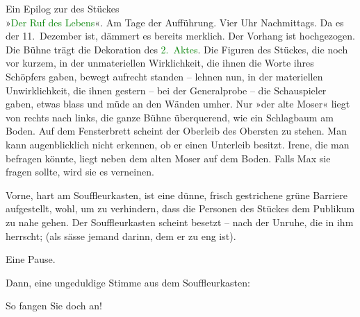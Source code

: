 \pstart
           \noindent{}\centering{}Ein Epilog zur \label{K_L01900-1v}\label{K_L01900-1h} des
                  Stückes{\\}»\textcolor{green}{Der Ruf des Lebens}{}\ledrightnote{\textcolor{green}{Der Ruf des Lebens. Schauspiel in drei Akten}}«.\pend
           {\bigskip}
\pstart
           \noindent{}Am Tage der Aufführung. Vier Uhr Nachmittags. Da es der 11. Dezember
               ist, dämmert es bereits merklich. Der Vorhang ist hochgezogen. Die Bühne trägt die
               Dekoration des \textcolor{green}{2. Aktes}{}\ledrightnote{{$\rightarrow$}\textcolor{green}{Der Ruf des Lebens. Schauspiel in drei Akten}}. Die
               Figuren des Stückes, die noch vor kurzem, in der unmateriellen Wirklichkeit, die
               ihnen die Worte ihres Schöpfers gaben, bewegt aufrecht standen – lehnen nun, in der
               materiellen Unwirklichkeit, die ihnen gestern – bei der Generalprobe – die
               Schauspieler gaben, etwas blass und müde an den Wänden umher. Nur »der alte Moser«
               liegt von rechts nach links, die ganze Bühne überquerend, wie ein Schlagbaum am
               Boden. Auf dem Fensterbrett scheint der Oberleib des Obersten zu stehen. Man kann
               augenblicklich nicht erkennen, ob er einen Unterleib besitzt. Irene, die man befragen
               könnte, liegt neben dem alten Moser auf dem Boden. Falls Max sie fragen sollte, wird
               sie es verneinen.\pend
           
\pstart
           Vorne, hart am Souffleurkasten, ist eine dünne, frisch gestrichene grüne Barriere
               aufgestellt, wohl, um zu verhindern, dass die Person\introOben{}en\introOben{} des
               Stückes dem Publikum zu nahe gehen. Der Souffleurkasten scheint besetzt – nach der
               Unruhe, die in ihm herrscht; (als sässe jemand darinn, dem er zu eng
               ist).\pend
           
\pstart
           Eine Pause.\pend
           
\pstart
           Dann, eine ungeduldige Stimme aus dem Souffleurkasten:\pend
           
\pstart
           {\pb}So fangen Sie doch an!\pend
           
